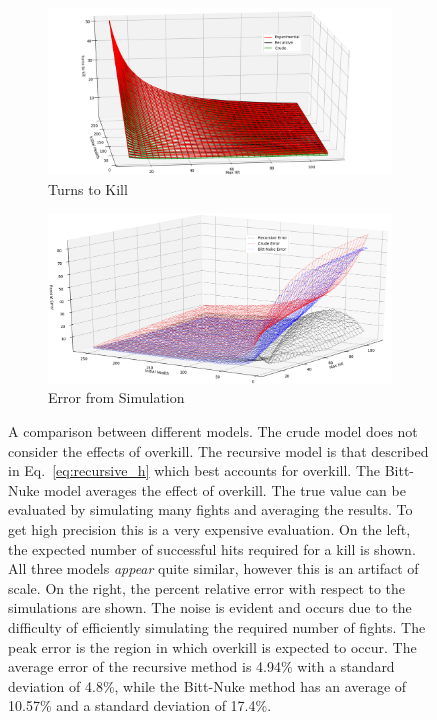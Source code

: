 \documentclass[../../main.tex]{subfiles}
\begin{document}
				\begin{figure}
					\centering
					\begin{subfigure}{.5\textwidth}
						\centering
						\includegraphics[width=\linewidth]{img/h2k_h2.png}
						\caption{Turns to Kill}
					\end{subfigure}%
					\begin{subfigure}{.5\textwidth}
						\centering
						\includegraphics[width=\linewidth]{img/error.png}
						\caption{Error from Simulation}
					\end{subfigure}
					\caption{
						A comparison between different models. The crude model does not consider the effects of overkill. The recursive model is that described in Eq.~\ref{eq:recursive_h} which best accounts for overkill. The Bitt-Nuke model averages the effect of overkill. The true value can be evaluated by simulating many fights and averaging the results. To get high precision this is a very expensive evaluation. On the left, the expected number of successful hits required for a kill is shown. All three models \textit{appear} quite similar, however this is an artifact of scale. On the right, the percent relative error with respect to the simulations are shown. The noise is evident and occurs due to the difficulty of efficiently simulating the required number of fights. The peak error is the region in which overkill is expected to occur. The average error of the recursive method is 4.94\% with a standard deviation of 4.8\%, while the Bitt-Nuke method has an average of 10.57\% and a standard deviation of 17.4\%.
					}\label{fig:comparison}
				\end{figure}
\end{document}
